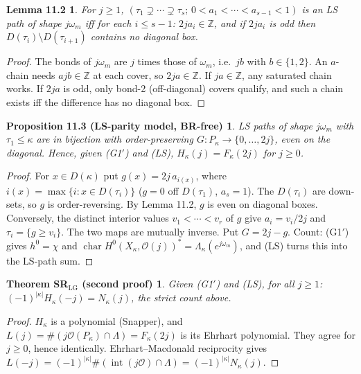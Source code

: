 \documentclass[10pt]{amsart}
\newcommand{\LG}{\mathrm{LG}}
\newtheorem*{lemB}{Lemma 11.2}
\newtheorem*{propC}{Proposition 11.3 (LS-parity model, BR-free)}
\newtheorem*{thmD}{Theorem SR$_{\LG}$ (second proof)}
\theoremstyle{remark}
\begin{document}
\begin{lemB}
For $j\ge1$, $(\tau_1\supsetneq\cdots\supsetneq\tau_s;\,0<a_1<\cdots<a_{s-1}<1)$ is an LS path of shape $j\omega_m$ iff for each
$i\le s-1$: $2ja_i\in\mathbb Z$, and if $2ja_i$ is odd then $D(\tau_i)\setminus D(\tau_{i+1})$ contains no diagonal box.
\end{lemB}
\begin{proof}
The bonds of $j\omega_m$ are $j$ times those of $\omega_m$, i.e.\ $jb$ with $b\in\{1,2\}$. An $a$-chain needs $ajb\in\mathbb Z$ at each
cover, so $2ja\in\mathbb Z$. If $ja\in\mathbb Z$, any saturated chain works. If $2ja$ is odd, only bond-2
(off-diagonal) covers qualify, and such a chain exists iff the difference has no diagonal box.
\end{proof}

\begin{propC}
LS paths of shape $j\omega_m$ with $\tau_1\le\kappa$ are in bijection with order-preserving $G:P_\kappa\to\{0,\dots,2j\}$, even on the
diagonal. Hence, given (G1$'$) and (LS), $H_\kappa(j)=F_\kappa(2j)$ for $j\ge0$.
\end{propC}
\begin{proof}
For $x\in D(\kappa)$ put $g(x)=2j\,a_{i(x)}$, where $i(x)=\max\{i:x\in D(\tau_i)\}$ ($g=0$ off $D(\tau_1)$, $a_s=1$). The
$D(\tau_i)$ are down-sets, so $g$ is order-reversing. By Lemma 11.2, $g$ is even on diagonal boxes. Conversely, the distinct interior values
$v_1<\cdots<v_r$ of $g$ give $a_i=v_i/2j$ and $\tau_i=\{g\ge v_i\}$. The two maps are mutually inverse. Put $G=2j-g$. Count:
(G1$'$) gives $h^0=\chi$ and $\operatorname{char}H^0(X_\kappa,\mathcal O(j))^*=\Lambda_\kappa(e^{j\omega_m})$, and (LS)
turns this into the LS-path sum.
\end{proof}

\begin{thmD}
Given (G1$'$) and (LS), for all $j\ge1$: $(-1)^{|\kappa|}H_\kappa(-j)=N_\kappa(j)$, the strict count above.
\end{thmD}
\begin{proof}
$H_\kappa$ is a polynomial (Snapper), and $L(j)=\#(j\mathcal O(P_\kappa)\cap\Lambda)=F_\kappa(2j)$ is its Ehrhart polynomial. They agree for
$j\ge0$, hence identically. Ehrhart--Macdonald reciprocity gives
$L(-j)=(-1)^{|\kappa|}\#(\operatorname{int}(j\mathcal O)\cap\Lambda)=(-1)^{|\kappa|}N_\kappa(j)$.
\end{proof}
\end{document}
